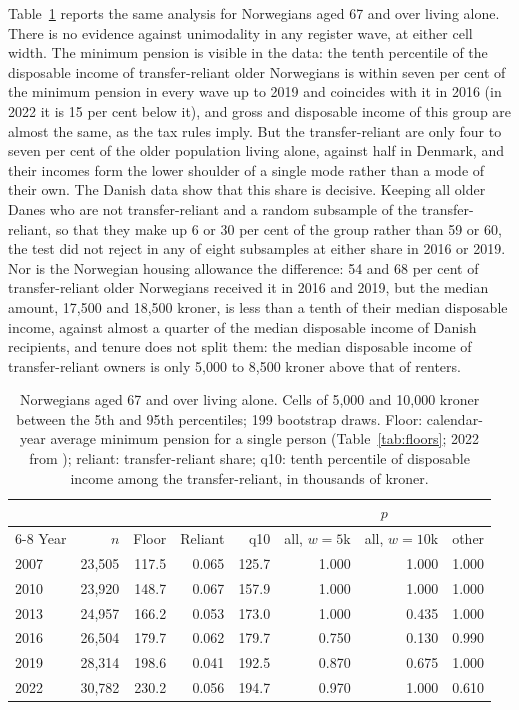 Table~\ref{tab:no} reports the same analysis for Norwegians aged 67 and over living alone. There is no evidence against unimodality in any register wave, at either cell width. The minimum pension is visible in the data: the tenth percentile of the disposable income of transfer-reliant older Norwegians is within seven per cent of the minimum pension in every wave up to 2019 and coincides with it in 2016 (in 2022 it is 15 per cent below it), and gross and disposable income of this group are almost the same, as the tax rules imply. But the transfer-reliant are only four to seven per cent of the older population living alone, against half in Denmark, and their incomes form the lower shoulder of a single mode rather than a mode of their own. The Danish data show that this share is decisive. Keeping all older Danes who are not transfer-reliant and a random subsample of the transfer-reliant, so that they make up 6 or 30 per cent of the group rather than 59 or 60, the test did not reject in any of eight subsamples at either share in 2016 or 2019. Nor is the Norwegian housing allowance the difference: 54 and 68 per cent of transfer-reliant older Norwegians received it in 2016 and 2019, but the median amount, 17{,}500 and 18{,}500 kroner, is less than a tenth of their median disposable income, against almost a quarter of the median disposable income of Danish recipients, and tenure does not split them: the median disposable income of transfer-reliant owners is only 5{,}000 to 8{,}500 kroner above that of renters.

\begin{table}[t]
\centering\small
\caption{Norwegians aged 67 and over living alone. Cells of 5{,}000 and 10{,}000 kroner between the 5th and 95th percentiles; 199 bootstrap draws. Floor: calendar-year average minimum pension for a single person (Table~\ref{tab:floors}; 2022 from \citealp{NOMeld2022}); reliant: transfer-reliant share; q10: tenth percentile of disposable income among the transfer-reliant, in thousands of kroner.}\label{tab:no}
\begin{tabular}{lrrrrrrr}
\toprule
 & & & & & \multicolumn{3}{c}{$p$}\\
\cmidrule(lr){6-8}
Year & $n$ & Floor & Reliant & q10 & all, $w=5$k & all, $w=10$k & other\\
\midrule
2007 & 23{,}505 & 117.5 & 0.065 & 125.7 & 1.000 & 1.000 & 1.000\\
2010 & 23{,}920 & 148.7 & 0.067 & 157.9 & 1.000 & 1.000 & 1.000\\
2013 & 24{,}957 & 166.2 & 0.053 & 173.0 & 1.000 & 0.435 & 1.000\\
2016 & 26{,}504 & 179.7 & 0.062 & 179.7 & 0.750 & 0.130 & 0.990\\
2019 & 28{,}314 & 198.6 & 0.041 & 192.5 & 0.870 & 0.675 & 1.000\\
2022 & 30{,}782 & 230.2 & 0.056 & 194.7 & 0.970 & 1.000 & 0.610\\
\bottomrule
\end{tabular}
\end{table}

